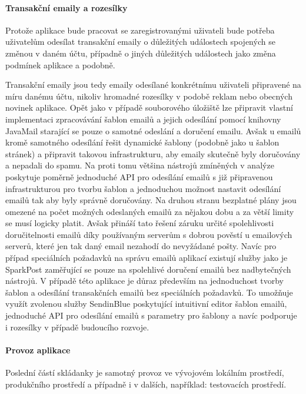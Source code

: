 \begin{itemize}
\begin{itemize}
			\paragraph{Transakční emaily a rozesílky}

			Protože aplikace bude pracovat se zaregistrovanými uživateli bude potřeba uživatelům odesílat transakční emaily
			o důležitých událostech spojených se změnou v daném účtu, případně o jiných důležitých událostech jako změna podmínek
			aplikace a podobně.

			Transakční emaily jsou tedy emaily odesílané konkrétnímu uživateli připravené na míru danému účtu, nikoliv
			hromadné rozesílky v podobě reklam nebo obecných novinek aplikace.
			Opět jako v případě souborového úložiště lze připravit vlastní implementaci zpracovávání šablon emailů a jejich
			odesílání pomocí knihovny JavaMail starající se pouze o samotné odeslání a doručení emailu.
			Avšak u emailů kromě samotného odesílání řešit dynamické šablony (podobně jako u šablon stránek) a připravit
			takovou infrastrukturu, aby emaily skutečně byly doručovány a nepadali do spamu.
			Na proti tomu většina nástrojů zmíněných v analýze poskytuje poměrně jednoduché \ac{API} pro odesílání emailů
			s již připravenou infrastrukturou pro tvorbu šablon a jednoduchou možnost nastavit odesílání emailů tak aby
			byly správně doručovány.
			Na druhou stranu bezplatné plány jsou omezené na počet možných odeslaných emailů za nějakou dobu a za větší limity
			se musí logicky platit.
			Avšak přináší tato řešení záruku určité spolehlivosti doručitelnosti emailů díky používaným serverům s dobrou pověstí
			u emailových serverů, které jen tak daný email nezahodí do nevyžádané pošty.
			Navíc pro případ speciálních požadavků na správu emailů aplikací existují služby jako je SparkPost zaměřující
			se pouze na spolehlivé doručení emailů bez nadbytečných nástrojů.
			V případě této aplikace je důraz především na jednoduchost tvorby šablon a odesílání transakčních emailů bez
			speciálních požadavků.
			To umožňuje využít zvolenou služby SendinBlue poskytující intuitivní editor šablon emailů, jednoduché \ac{API}
			pro odesílání emailů s parametry pro šablony a navíc podporuje i rozesílky v případě budoucího rozvoje.

			\paragraph{Provoz aplikace}

			Poslední částí skládanky je samotný provoz ve vývojovém lokálním prostředí, produkčního prostředí a případně
			i v dalších, například: testovacích prostředí.


\end{itemize}
\end{itemize}
